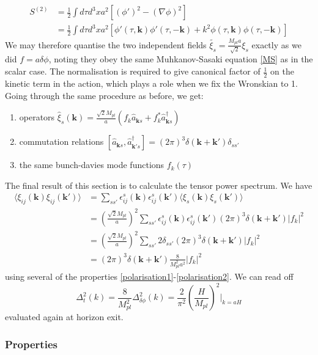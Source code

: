 \documentclass[a4paper,10pt]{article}
\renewcommand{\v}[1]{\mathbf{#1}}
\newcommand{\Mp}{M_{pl}}
\newcommand{\half}{\frac{1}{2}}
\newcommand{\anns}[2]{\hat{a}_{\v{#1}#2}}
\newcommand{\cres}[2]{\hat{a}^\dagger_{\v{#1}#2}}
\begin{document}
\begin{equation}\begin{split}
S^{(2)} &= \half \int d\tau d^3x a^2 [(\phi ' )^2 -(\nabla \phi)^2]\\
 &= \half \int d\tau d^3x a^2 [\phi'(\tau, \v{k})\phi'(\tau,\v{-k}) + k^2 \phi(\tau,\v{k})\phi(\tau,\v{-k})]
\end{split}\end{equation}
We may therefore quantise the two independent fields $\tilde{\xi_s} = \frac{\Mp a}{\sqrt{2}} \xi_s$ exactly as we did $ f = a \delta \phi$, noting they obey the same Muhkanov-Sasaki equation \ref{MS} as in the scalar case. The normalisation is required to give canonical factor of $\half$ on the kinetic term in the action, which plays a role when we fix the Wronskian to 1. Going through the same procedure as before, we get:
\begin{enumerate}
\item{operators $\hat{\xi}_s(\v{k}) = \frac{\sqrt{2}\Mp}{a}(f_k\anns{k}{s}+f_k^*\cres{k}{s})$}
\item{commutation relations $[\anns{k}{s},\cres{k'}{s}] = (2\pi)^3\delta(\v{k}+\v{k'})\delta_{ss'}$}
\item{the same bunch-davies mode functions $f_k(\tau)$}
\end{enumerate}
The final result of this section is to calculate the tensor power spectrum. We have
\begin{equation}\begin{split}
\langle\xi_{ij}(\v{k})\xi_{ij}(\v{k'})\rangle & = \sum_{ss'} \epsilon^s_{ij}(\v{k})\epsilon^s_{ij}(\v{k'})\langle\xi_{s}(\v{k})\xi_{s}(\v{k'})\rangle\\
&= (\frac{\sqrt{2}\Mp}{a})^2 \sum_{ss'} \epsilon^s_{ij}(\v{k})\epsilon^s_{ij}(\v{k'})(2\pi)^3\delta(\v{k}+\v{k'})|f_k|^2\\
&= (\frac{\sqrt{2}\Mp}{a})^2 \sum_{ss'} 2\delta_{ss'}(2\pi)^3\delta(\v{k}+\v{k'})|f_k|^2\\
&= (2\pi)^3\delta(\v{k}+\v{k'})\frac{8}{\Mp^2a^2}|f_k|^2
\end{split}\end{equation}
using several of the properties \ref{polarisation1}-\ref{polarisation2}. We can read off 
\begin{equation}
\Delta^2_t(k)=\frac{8}{\Mp^2}\Delta^2_{\delta\phi}(k) = \frac{2}{\pi^2}\left(\frac{H}{\Mp}\right)^2 \rvert_{k=aH}
\end{equation}
evaluated again at horizon exit.
\subsubsection{Properties}
\end{document}
